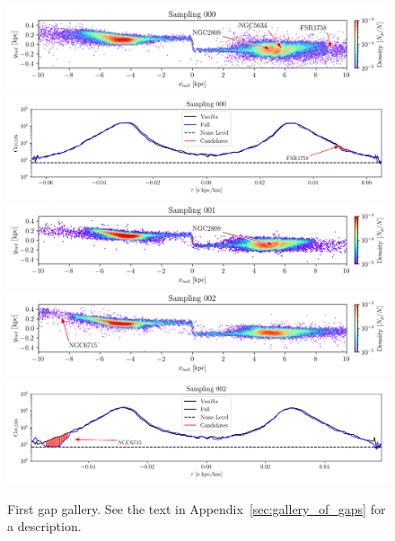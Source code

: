 \documentclass[draft]{aa}
\begin{document}
\begin{appendix}
    \begin{figure}
      \centering
      \includegraphics[width=\linewidth]{gallery_of_gaps_monte-carlo-000.png}
      \includegraphics[width=\linewidth]{tau-profile-monte-carlo-000.png}
      \includegraphics[width=\linewidth]{gallery_of_gaps_monte-carlo-001.png}
      \includegraphics[width=\linewidth]{gallery_of_gaps_monte-carlo-002.png}
      \includegraphics[width=\linewidth]{tau-profile-monte-carlo-002.png}
      \caption{First gap gallery. See the text in Appendix~\ref{sec:gallery_of_gaps} for a description.}
      \label{fig:gallery0}
      \end{figure}    



\end{appendix}
\end{document}
